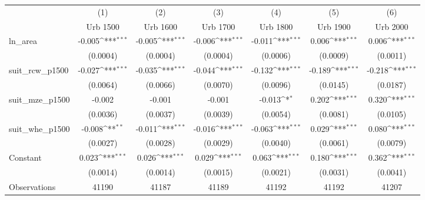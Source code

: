 {
\def\sym#1{\ifmmode^{#1}\else\(^{#1}\)\fi}
\begin{tabular}{l*{6}{c}}
\toprule
                    &\multicolumn{1}{c}{(1)}&\multicolumn{1}{c}{(2)}&\multicolumn{1}{c}{(3)}&\multicolumn{1}{c}{(4)}&\multicolumn{1}{c}{(5)}&\multicolumn{1}{c}{(6)}\\
                    &\multicolumn{1}{c}{Urb 1500}&\multicolumn{1}{c}{Urb 1600}&\multicolumn{1}{c}{Urb 1700}&\multicolumn{1}{c}{Urb 1800}&\multicolumn{1}{c}{Urb 1900}&\multicolumn{1}{c}{Urb 2000}\\
\midrule
ln\_area             &      -0.005\sym{***}&      -0.005\sym{***}&      -0.006\sym{***}&      -0.011\sym{***}&       0.006\sym{***}&       0.006\sym{***}\\
                    &    (0.0004)         &    (0.0004)         &    (0.0004)         &    (0.0006)         &    (0.0009)         &    (0.0011)         \\
\addlinespace
suit\_rcw\_p1500      &      -0.027\sym{***}&      -0.035\sym{***}&      -0.044\sym{***}&      -0.132\sym{***}&      -0.189\sym{***}&      -0.218\sym{***}\\
                    &    (0.0064)         &    (0.0066)         &    (0.0070)         &    (0.0096)         &    (0.0145)         &    (0.0187)         \\
\addlinespace
suit\_mze\_p1500      &      -0.002         &      -0.001         &      -0.001         &      -0.013\sym{*}  &       0.202\sym{***}&       0.320\sym{***}\\
                    &    (0.0036)         &    (0.0037)         &    (0.0039)         &    (0.0054)         &    (0.0081)         &    (0.0105)         \\
\addlinespace
suit\_whe\_p1500      &      -0.008\sym{**} &      -0.011\sym{***}&      -0.016\sym{***}&      -0.063\sym{***}&       0.029\sym{***}&       0.080\sym{***}\\
                    &    (0.0027)         &    (0.0028)         &    (0.0029)         &    (0.0040)         &    (0.0061)         &    (0.0079)         \\
\addlinespace
Constant            &       0.023\sym{***}&       0.026\sym{***}&       0.029\sym{***}&       0.063\sym{***}&       0.180\sym{***}&       0.362\sym{***}\\
                    &    (0.0014)         &    (0.0014)         &    (0.0015)         &    (0.0021)         &    (0.0031)         &    (0.0041)         \\
\midrule
Observations        &       41190         &       41187         &       41189         &       41192         &       41192         &       41207         \\

\end{tabular}}
